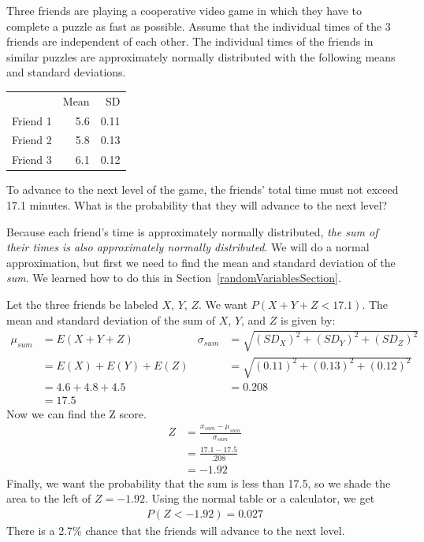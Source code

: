 \begin{example}{Three friends are playing a cooperative video game in which they have to complete a puzzle as fast as possible. Assume that the individual times of the 3 friends are independent of each other. The individual times of the friends in similar puzzles are approximately normally distributed with the following means and standard deviations. 
\begin{center}
\begin{tabular}{lrr}
& Mean &  SD \\
Friend 1 	& 5.6 & 0.11  \\
Friend 2 	& 5.8  & 0.13 \\
Friend 3 	& 6.1  & 0.12  
\end{tabular}
\end{center}
To advance to the next level of the game, the friends' total time must not exceed 17.1 minutes. What is the probability that they will advance to the next level?}
Because each friend's time is approximately normally distributed, \emph{the sum of their times is also approximately normally distributed}. We will do a normal approximation, but first we need to find the mean and standard deviation of the \emph{sum}. We learned how to do this in Section~\ref{randomVariablesSection}.

Let the three friends be labeled $X$, $Y$, $Z$. We want $P(X + Y + Z < 17.1)$. The mean and standard deviation of the sum of $X$, $Y$, and $Z$ is given by:
\begin{align*}
\mu_{sum} &= E(X+Y+Z)
	& \sigma_{sum}&= \sqrt{(SD_X)^2+(SD_Y)^2 + (SD_Z)^2} \\
&= E(X) + E(Y) + E(Z)
	& &= \sqrt{(0.11)^2+(0.13)^2+(0.12)^2}\\
&=4.6+4.8+4.5
	& &= 0.208 \\
&=17.5
\end{align*}
Now we can find the Z score. 
\begin{align*}
Z &= \frac{x_{sum}-\mu_{sum}}{\sigma_{sum}} \\
&=\frac{17.1-17.5}{.208} \\
&=-1.92
\end{align*}
Finally, we want the probability that the sum is less than 17.5, so we shade the area to the left of $Z = -1.92$. Using the normal table or a calculator, we get
\begin{align*}
P(Z < -1.92) = 0.027
\end{align*}
There is a 2.7\% chance that the friends will advance to the next level.
\end{example}

